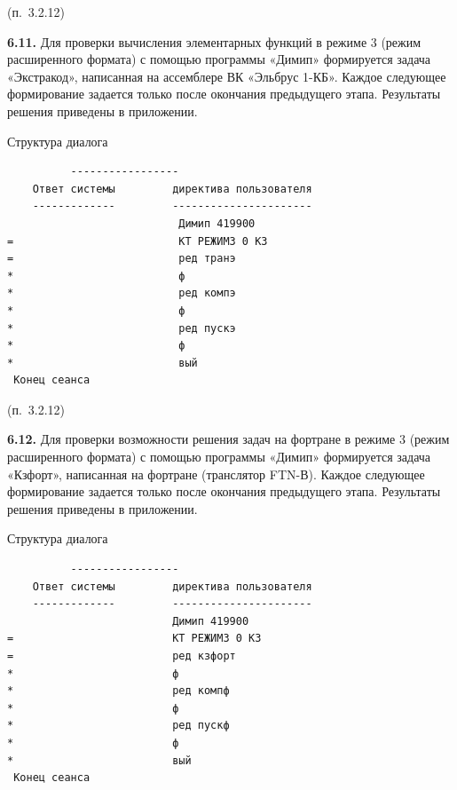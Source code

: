 \documentclass[11pt,a4paper]{article}
\begin{document}
\begin{center}(п.~3.2.12)\end{center}
\par\textbf{6.11.} Для проверки вычисления элементарных функций в режиме 3 (режим расширенного формата) с помощью программы «Димип» формируется задача «Экстракод», написанная на ассемблере ВК «Эльбрус 1-КБ». Каждое следующее формирование задается только после окончания предыдущего этапа. Результаты решения приведены в приложении.\par
\begin{center}Структура диалога\end{center}
\begin{center}\small
\begin{BVerbatim}
          -----------------
    Ответ системы         директива пользователя
    -------------         ----------------------
                           Димип 419900
=                          КТ РЕЖИМ3 0 КЗ
=                          ред транэ
*                          ф
*                          ред компэ
*                          ф
*                          ред пускэ
*                          ф
*                          вый
 Конец сеанса
\end{BVerbatim}
\end{center}

\begin{center}(п.~3.2.12)\end{center}
\par\textbf{6.12.} Для проверки возможности решения задач на фортране в режиме 3 (режим расширенного формата) с помощью программы «Димип» формируется задача «Кзфорт», написанная на фортране (транслятор FTN-В). Каждое следующее формирование задается только после окончания предыдущего этапа. Результаты решения приведены в приложении.\par
\begin{center}Структура диалога\end{center}
\begin{center}\small
\begin{BVerbatim}
          -----------------
    Ответ системы         директива пользователя
    -------------         ----------------------
                          Димип 419900
=                         КТ РЕЖИМ3 0 КЗ
=                         ред кзфорт
*                         ф
*                         ред компф
*                         ф
*                         ред пускф
*                         ф
*                         вый
 Конец сеанса
\end{BVerbatim}
\end{center}
\end{document}
